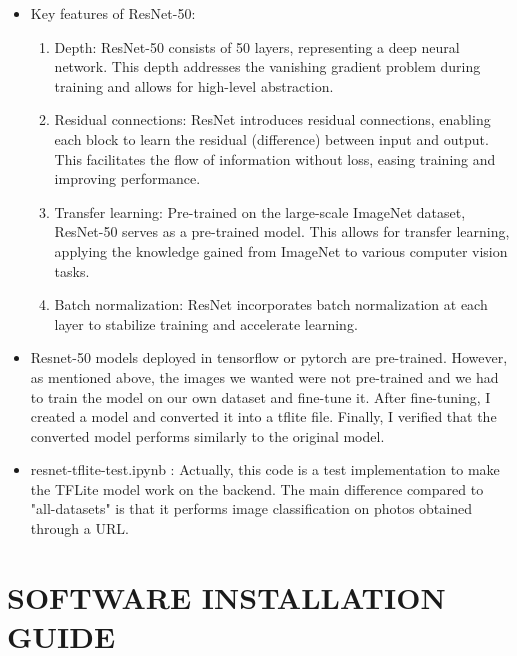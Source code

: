 \documentclass[conference, a4paper]{IEEEtran}
\begin{document}
\begin{enumerate}
\begin{itemize}
        \item[] Key features of ResNet-50:
        \begin{enumerate}
            \item Depth: ResNet-50 consists of 50 layers, representing a deep neural network. This depth addresses the vanishing gradient problem during training and allows for high-level abstraction. \\
            \item Residual connections: ResNet introduces residual connections, enabling each block to learn the residual (difference) between input and output. This facilitates the flow of information without loss, easing training and improving performance. \\
            \item Transfer learning: Pre-trained on the large-scale ImageNet dataset, ResNet-50 serves as a pre-trained model. This allows for transfer learning, applying the knowledge gained from ImageNet to various computer vision tasks. \\
            \item Batch normalization: ResNet incorporates batch normalization at each layer to stabilize training and accelerate learning.
        \end{enumerate}
        \item[] Resnet-50 models deployed in tensorflow or pytorch are pre-trained. However, as mentioned above, the images we wanted were not pre-trained and we had to train the model on our own dataset and fine-tune it. After fine-tuning, I created a model and converted it into a tflite file. Finally, I verified that the converted model performs similarly to the original model. \\

        \item resnet-tflite-test.ipynb : Actually, this code is a test implementation to make the TFLite model work on the backend. The main difference compared to "all-datasets" is that it performs image classification on photos obtained through a URL.
        
    \end{itemize}
\end{enumerate}


\section{SOFTWARE INSTALLATION GUIDE}
\end{document}
